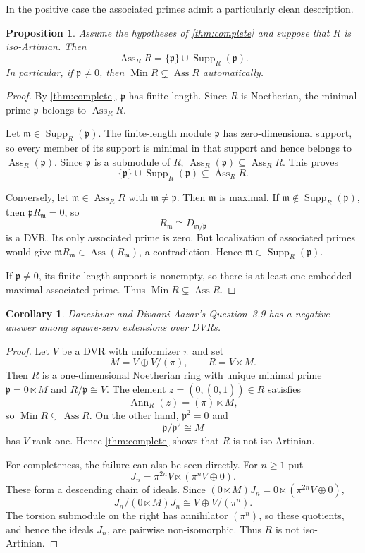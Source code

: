 \documentclass[11pt]{article}
\newtheorem{proposition}[theorem]{Proposition}
\newtheorem{corollary}[theorem]{Corollary}
\theoremstyle{definition}
\newcommand{\Ass}{\operatorname{Ass}}
\newcommand{\Min}{\operatorname{Min}}
\newcommand{\Supp}{\operatorname{Supp}}
\newcommand{\Ann}{\operatorname{Ann}}
\begin{document}
In the positive case the associated primes admit a particularly clean description.

\begin{proposition}\label{prop:ass-positive}
Assume the hypotheses of \cref{thm:complete} and suppose that $R$ is iso-Artinian.  Then
\[
 \Ass_RR=\{\mathfrak p\}\cup\Supp_R(\mathfrak p).
\]
In particular, if $\mathfrak p\ne0$, then
$\Min R\subsetneq\Ass R$ automatically.
\end{proposition}

\begin{proof}
By \cref{thm:complete}, $\mathfrak p$ has finite length.  Since $R$ is Noetherian, the minimal
prime $\mathfrak p$ belongs to $\Ass_RR$.

Let $\mathfrak m\in\Supp_R(\mathfrak p)$.  The finite-length module $\mathfrak p$ has
zero-dimensional support, so every member of its support is minimal in that support and hence
belongs to $\Ass_R(\mathfrak p)$.  Since $\mathfrak p$ is a submodule of $R$,
$\Ass_R(\mathfrak p)\subseteq\Ass_RR$.  This proves
\[
 \{\mathfrak p\}\cup\Supp_R(\mathfrak p)\subseteq\Ass_RR.
\]

Conversely, let $\mathfrak m\in\Ass_RR$ with $\mathfrak m\ne\mathfrak p$.  Then
$\mathfrak m$ is maximal.  If $\mathfrak m\notin\Supp_R(\mathfrak p)$, then
$\mathfrak pR_{\mathfrak m}=0$, so
\[
 R_{\mathfrak m}\cong D_{\mathfrak m/\mathfrak p}
\]
is a DVR.  Its only associated prime is zero.  But localization of associated primes would give
$\mathfrak mR_{\mathfrak m}\in\Ass(R_{\mathfrak m})$, a contradiction.  Hence
$\mathfrak m\in\Supp_R(\mathfrak p)$.

If $\mathfrak p\ne0$, its finite-length support is nonempty, so there is at least one embedded
maximal associated prime.  Thus $\Min R\subsetneq\Ass R$.
\end{proof}

\begin{corollary}\label{cor:q39-negative-exists}
 Daneshvar and Divaani-Aazar's Question~3.9 has a negative answer  among square-zero
extensions over DVRs.
\end{corollary}

\begin{proof}
Let $V$ be a DVR with uniformizer $\pi$ and set
\[
 M=V\oplus V/(\pi),
 \qquad
 R=V\ltimes M.
\]
Then $R$ is a one-dimensional Noetherian ring with unique minimal prime
$\mathfrak p=0\ltimes M$ and $R/\mathfrak p\cong V$.  The element
$z=(0,(0,\overline1))\in R$ satisfies
\[
 \Ann_R(z)=(\pi)\ltimes M,
\]
so $\Min R\subsetneq\Ass R$.  On the other hand,
$\mathfrak p^2=0$ and
\[
 \mathfrak p/\mathfrak p^2\cong M
\]
has $V$-rank one.  Hence \cref{thm:complete} shows that $R$ is not iso-Artinian.

For completeness, the failure can also be seen directly.  For $n\ge1$ put
\[
 J_n=\pi^{2n}V\ltimes(\pi^nV\oplus0).
\]
These form a descending chain of ideals.  Since
$(0\ltimes M)J_n=0\ltimes(\pi^{2n}V\oplus0)$,
\[
 J_n/(0\ltimes M)J_n\cong V\oplus V/(\pi^n).
\]
The torsion submodule on the right has annihilator $(\pi^n)$, so these quotients, and hence the
ideals $J_n$, are pairwise non-isomorphic.  Thus $R$ is not iso-Artinian.
\end{proof}
\end{document}
